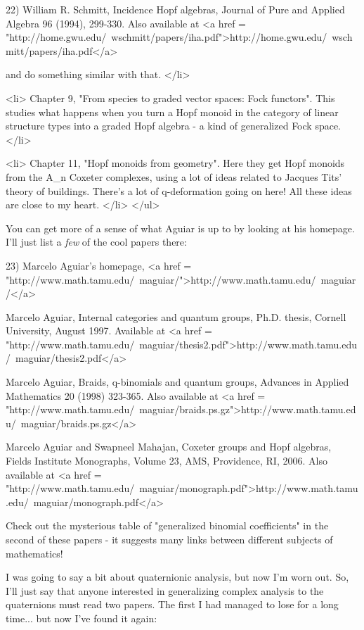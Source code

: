 22) William R. Schmitt, Incidence Hopf algebras, Journal of Pure and 
Applied Algebra 96 (1994), 299-330.   Also available at
<a href = "http://home.gwu.edu/~wschmitt/papers/iha.pdf">http://home.gwu.edu/~wschmitt/papers/iha.pdf</a>

and do something similar with that.
</li>

<li>
Chapter 9, "From species to graded vector spaces: Fock functors".
This studies what happens when you turn a Hopf monoid in the 
category of linear structure types into a graded Hopf algebra -
a kind of generalized Fock space.
</li>

<li>
Chapter 11, "Hopf monoids from geometry".  Here they get Hopf
monoids from the A_{n} Coxeter complexes, using a lot of ideas related
to Jacques Tits' theory of buildings.  There's a lot of q-deformation
going on here!  All these ideas are close to my heart.
</li>
</ul>

You can get more of a sense of what Aguiar is up to by looking at 
his homepage.  I'll just list a \emph{few} of the cool papers there:

23) Marcelo Aguiar's homepage, <a href = "http://www.math.tamu.edu/~maguiar/">http://www.math.tamu.edu/~maguiar/</a>

Marcelo Aguiar, Internal categories and quantum groups, Ph.D. thesis,
Cornell University, August 1997.  Available at
<a href = "http://www.math.tamu.edu/~maguiar/thesis2.pdf">http://www.math.tamu.edu/~maguiar/thesis2.pdf</a>

Marcelo Aguiar, Braids, q-binomials and quantum groups, Advances in 
Applied Mathematics 20 (1998) 323-365.  Also available at
<a href = "http://www.math.tamu.edu/~maguiar/braids.ps.gz">http://www.math.tamu.edu/~maguiar/braids.ps.gz</a>

Marcelo Aguiar and Swapneel Mahajan, Coxeter groups and Hopf 
algebras, Fields Institute Monographs, Volume 23, AMS, Providence, RI,
2006.  Also available at <a href = "http://www.math.tamu.edu/~maguiar/monograph.pdf">http://www.math.tamu.edu/~maguiar/monograph.pdf</a>

Check out the mysterious table of "generalized binomial
coefficients" in the second of these papers - it suggests
many links between different subjects of mathematics!

I was going to say a bit about quaternionic analysis, but now I'm
worn out.  So, I'll just say that anyone interested in generalizing
complex analysis to the quaternions must read two papers.  The first
I had managed to lose for a long time... but now I've found it again:

